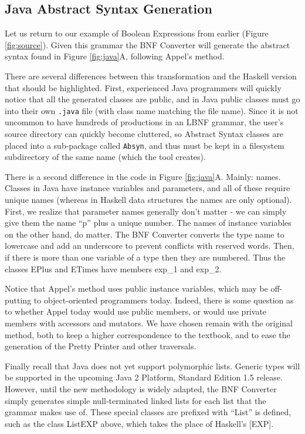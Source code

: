 \documentclass{llncs}
\begin{document}
\subsection{Java Abstract Syntax Generation}

Let us return to our example of Boolean Expressions from earlier (Figure \ref{fig:source}). Given this grammar the BNF Converter will generate the abstract syntax found in Figure \ref{fig:java}A, following Appel's method.

There are several differences between this transformation and the Haskell version that should be highlighted. First, experienced Java programmers will quickly notice that all the generated classes are public, and in Java public classes must go into their own \texttt{.java} file (with class name matching the file name). Since it is not uncommon to have hundreds of productions in an LBNF grammar, the user's source directory can quickly become cluttered, so Abstract Syntax classes are placed into a sub-package called {\tt Absyn}, and thus must be kept in a filesystem subdirectory of the same name (which the tool creates).

There is a second difference in the code in Figure \ref{fig:java}A. Mainly: names. Classes in Java have instance variables and parameters, and all of these require unique names (whereas in Haskell data structures the names are only optional). First, we realize that parameter names generally don't matter - we can simply give them the name ``p'' plus a unique number. The names of instance variables on the other hand, do matter. The BNF Converter converts the type name to lowercase and add an underscore to prevent conflicts with reserved words. Then, if there is more than one variable of a type then they are numbered. Thus the classes EPlus and ETimes have members exp\_1 and exp\_2.

Notice that Appel's method uses public instance variables, which may be off-putting to object-oriented programmers today. Indeed, there is some question as to whether Appel today would use public members, or would use private members with accessors and mutators. We have chosen remain with the original method, both to keep a higher correspondence to the textbook, 
and to ease the generation of the Pretty Printer and other traversals.

Finally recall that Java does not yet support polymorphic lists. Generic types will be supported in the upcoming Java 2 Platform, Standard Edition 1.5 release. However, until the new methodology is widely adapted, the BNF Converter simply generates simple null-terminated linked lists for each list that the grammar makes use of. These special classes are prefixed with ``List'' is defined, such as the class ListEXP above, which takes the place of Haskell's [EXP].
\end{document}
